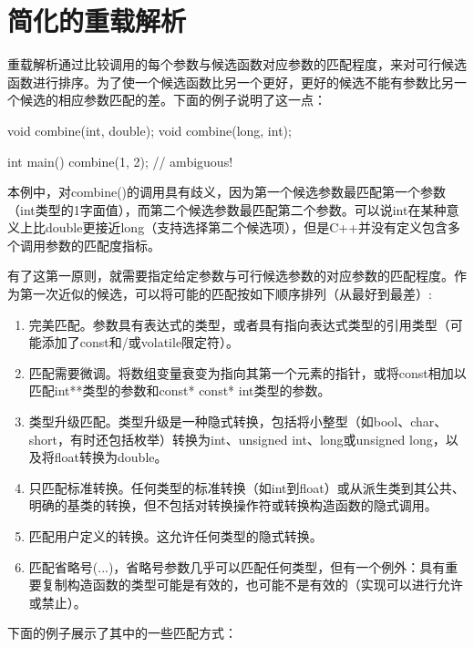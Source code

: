 \section{简化的重载解析}

重载解析通过比较调用的每个参数与候选函数对应参数的匹配程度，来对可行候选函数进行排序。为了使一个候选函数比另一个更好，更好的候选不能有参数比另一个候选的相应参数匹配的差。下面的例子说明了这一点：

\begin{cpp}
void combine(int, double);
void combine(long, int);

int main() {
	combine(1, 2); // ambiguous!
}
\end{cpp}

本例中，对combine()的调用具有歧义，因为第一个候选参数最匹配第一个参数（int类型的1字面值），而第二个候选参数最匹配第二个参数。可以说int在某种意义上比double更接近long（支持选择第二个候选项），但是C++并没有定义包含多个调用参数的匹配度指标。

有了这第一原则，就需要指定给定参数与可行候选参数的对应参数的匹配程度。作为第一次近似的候选，可以将可能的匹配按如下顺序排列（从最好到最差）:

\begin{enumerate}
\item 
完美匹配。参数具有表达式的类型，或者具有指向表达式类型的引用类型（可能添加了const和/或volatile限定符）。

\item 
匹配需要微调。将数组变量衰变为指向其第一个元素的指针，或将const相加以匹配int**类型的参数和const* const* int类型的参数。


\item 
类型升级匹配。类型升级是一种隐式转换，包括将小整型（如bool、char、short，有时还包括枚举）转换为int、unsigned int、long或unsigned long，以及将float转换为double。


\item 
只匹配标准转换。任何类型的标准转换（如int到float）或从派生类到其公共、明确的基类的转换，但不包括对转换操作符或转换构造函数的隐式调用。


\item 
匹配用户定义的转换。这允许任何类型的隐式转换。


\item 
匹配省略号(...)，省略号参数几乎可以匹配任何类型，但有一个例外：具有重要复制构造函数的类型可能是有效的，也可能不是有效的（实现可以进行允许或禁止）。
\end{enumerate}

下面的例子展示了其中的一些匹配方式：

